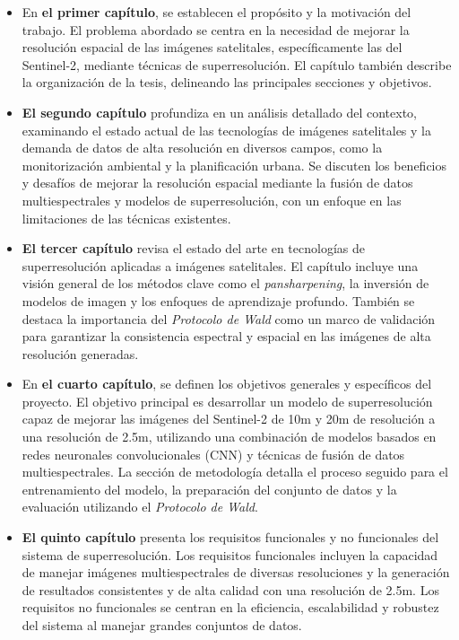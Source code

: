 \begin{itemize}
    \item En \textbf{el primer capítulo}, se establecen el propósito y la motivación del trabajo. El problema abordado se centra en la necesidad de mejorar la resolución espacial de las imágenes satelitales, específicamente las del Sentinel-2, mediante técnicas de superresolución. El capítulo también describe la organización de la tesis, delineando las principales secciones y objetivos.

    \item \textbf{El segundo capítulo} profundiza en un análisis detallado del contexto, examinando el estado actual de las tecnologías de imágenes satelitales y la demanda de datos de alta resolución en diversos campos, como la monitorización ambiental y la planificación urbana. Se discuten los beneficios y desafíos de mejorar la resolución espacial mediante la fusión de datos multiespectrales y modelos de superresolución, con un enfoque en las limitaciones de las técnicas existentes.

    \item \textbf{El tercer capítulo} revisa el estado del arte en tecnologías de superresolución aplicadas a imágenes satelitales. El capítulo incluye una visión general de los métodos clave como el \textit{pansharpening}, la inversión de modelos de imagen y los enfoques de aprendizaje profundo. También se destaca la importancia del \textit{Protocolo de Wald} como un marco de validación para garantizar la consistencia espectral y espacial en las imágenes de alta resolución generadas.

    \item En \textbf{el cuarto capítulo}, se definen los objetivos generales y específicos del proyecto. El objetivo principal es desarrollar un modelo de superresolución capaz de mejorar las imágenes del Sentinel-2 de 10m y 20m de resolución a una resolución de 2.5m, utilizando una combinación de modelos basados en redes neuronales convolucionales (CNN) y técnicas de fusión de datos multiespectrales. La sección de metodología detalla el proceso seguido para el entrenamiento del modelo, la preparación del conjunto de datos y la evaluación utilizando el \textit{Protocolo de Wald}.

    \item \textbf{El quinto capítulo} presenta los requisitos funcionales y no funcionales del sistema de superresolución. Los requisitos funcionales incluyen la capacidad de manejar imágenes multiespectrales de diversas resoluciones y la generación de resultados consistentes y de alta calidad con una resolución de 2.5m. Los requisitos no funcionales se centran en la eficiencia, escalabilidad y robustez del sistema al manejar grandes conjuntos de datos.


\end{itemize}
